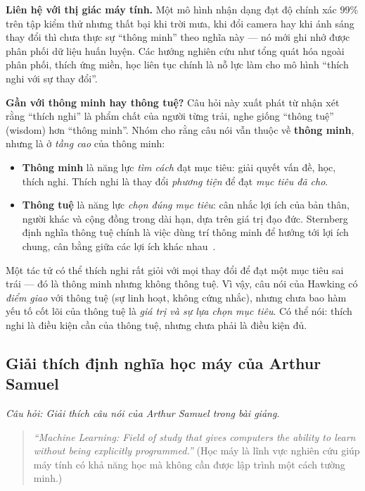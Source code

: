 \textbf{Liên hệ với thị giác máy tính.} Một mô hình nhận dạng đạt độ chính xác $99\%$ trên tập kiểm thử nhưng thất bại khi trời mưa, khi đổi camera hay khi ánh sáng thay đổi thì chưa thực sự ``thông minh'' theo nghĩa này — nó mới ghi nhớ được phân phối dữ liệu huấn luyện. Các hướng nghiên cứu như tổng quát hóa ngoài phân phối, thích ứng miền, học liên tục chính là nỗ lực làm cho mô hình ``thích nghi với sự thay đổi''.

\textbf{Gần với thông minh hay thông tuệ?} Câu hỏi này xuất phát từ nhận xét rằng ``thích nghi'' là phẩm chất của người từng trải, nghe giống ``thông tuệ'' (wisdom) hơn ``thông minh''. Nhóm cho rằng câu nói vẫn thuộc về \textbf{thông minh}, nhưng là ở \emph{tầng cao} của thông minh:
\begin{itemize}
    \item \textbf{Thông minh} là năng lực \emph{tìm cách} đạt mục tiêu: giải quyết vấn đề, học, thích nghi. Thích nghi là thay đổi \emph{phương tiện} để đạt \emph{mục tiêu đã cho}.
    \item \textbf{Thông tuệ} là năng lực \emph{chọn đúng mục tiêu}: cân nhắc lợi ích của bản thân, người khác và cộng đồng trong dài hạn, dựa trên giá trị đạo đức. Sternberg định nghĩa thông tuệ chính là việc dùng trí thông minh để hướng tới lợi ích chung, cân bằng giữa các lợi ích khác nhau~\citep{sternberg1998balance}.
\end{itemize}
Một tác tử có thể thích nghi rất giỏi với mọi thay đổi để đạt một mục tiêu sai trái — đó là thông minh nhưng không thông tuệ. Vì vậy, câu nói của Hawking có \emph{điểm giao} với thông tuệ (sự linh hoạt, không cứng nhắc), nhưng chưa bao hàm yếu tố cốt lõi của thông tuệ là \emph{giá trị và sự lựa chọn mục tiêu}. Có thể nói: thích nghi là điều kiện cần của thông tuệ, nhưng chưa phải là điều kiện đủ.

\subsection{Giải thích định nghĩa học máy của Arthur Samuel}
\label{subsec:w2_samuel}

\textit{Câu hỏi: Giải thích câu nói của Arthur Samuel trong bài giảng.}

\begin{quote}
\textit{``Machine Learning: Field of study that gives computers the ability to learn without being explicitly programmed.''} (Học máy là lĩnh vực nghiên cứu giúp máy tính có khả năng học mà không cần được lập trình một cách tường minh.)
\end{quote}

